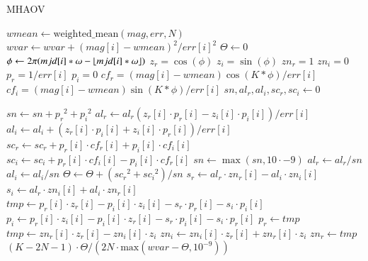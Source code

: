 \begin{algorithm}[H]
\caption{MHAOV}\label{alg:mhaov}
\begin{algorithmic}[1]
    \State $wmean \gets \text{weighted\_mean}(mag, err, N)$ 
\State $wvar \gets wvar + (mag[i] - wmean)^{2}/err[i]^{2}$ 
\EndFor
\State $\Theta \gets 0$
    \State $\phi \gets 2 \pi (mjd[i]*\omega - \lfloor mjd[i]*\omega\rfloor)$
    \State $z_r = \cos(\phi)$ 
    \State $z_i = \sin(\phi)$ 
    \State $zn_r = 1$ 
    \State $zn_i = 0$
    \State $p_r = 1/err[i]$
    \State $p_i = 0$
    \State $cf_r = (mag[i] - wmean)\cos(K * \phi) / err[i]$
    \State $cf_i = (mag[i] - wmean)\sin(K * \phi) / err[i]$
\EndFor
{}
    \State $sn, al_r, al_i, sc_r, sc_i \gets 0$

    \State $sn \gets sn + {p_r}^{2}+ {p_i}^{2}  $
    \State $al_r \gets al_r (z_r[i] \cdot  p_r[i] - z_i[i] \cdot  p_i[i])/err[i]$ 
        \State $al_i \gets al_i + ( z_r[i] \cdot  p_i[i] + z_i[i] \cdot  p_r[i])/err[i]$
        \State $sc_r \gets sc_r + p_r[i] \cdot  cf_r[i] + p_i[i] \cdot  cf_i[i]$ 
        \State $sc_i \gets sc_i + p_r[i] \cdot  cf_i[i] - p_i[i] \cdot  cf_r[i]$
    \EndFor
    \State $sn \gets \max(sn, 10\cdot {-9})$
    \State $al_r \gets al_r/sn$
    \State $al_i \gets al_i/sn$
    \State $\Theta \gets \Theta + ({sc_r}^{2} + {sc_i}^{2})/sn$
        \State $s_r \gets al_r \cdot zn_r[i] - al_i \cdot zn_i[i]$
        \State $s_i \gets al_r \cdot zn_i[i] + al_i \cdot zn_r[i]$
        \State $tmp \gets p_r[i]\cdot z_r[i] - p_i[i]\cdot z_i[i] - s_r\cdot p_r[i] - s_i\cdot p_i[i]$
        \State $p_i \gets p_r[i]\cdot z_i[i] - p_i[i]\cdot z_r[i] - s_r\cdot p_i[i] - s_i\cdot p_r[i]$ 
        \State $p_r \gets tmp$
        \State $tmp \gets zn_r[i] \cdot z_r[i] - zn_i[i] \cdot z_i$
        \State $zn_i \gets zn_i[i] \cdot z_r[i] + zn_r[i] \cdot z_i$ 
        \State $zn_r \gets tmp$
    \EndFor
\EndFor
\State \Return $(K-2N-1)\cdot \Theta / (2N\cdot \text{max}(wvar - \Theta, 10^{-9}))$

\end{algorithmic}
\end{algorithm}

